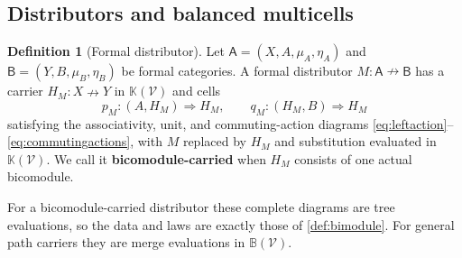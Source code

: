 \documentclass[11pt,reqno]{amsart}
\theoremstyle{plain}
\theoremstyle{definition}
\newtheorem{definition}[theorem]{Definition}
\theoremstyle{remark}
\numberwithin{equation}{section}
\newcommand{\V}{\mathcal V}
\newcommand{\Kcal}{\mathbb K}
\newcommand{\harr}{\mathrel{\nrightarrow}}
\newcommand{\cell}{\mathrel{\Longrightarrow}}
\begin{document}
\subsection{Distributors and balanced multicells}

\begin{definition}[Formal distributor]\label{def:formaldistributor}
Let $\mathsf A=(X,A,\mu_A,\eta_A)$ and
$\mathsf B=(Y,B,\mu_B,\eta_B)$ be formal categories. A formal
distributor $M:\mathsf A\harr\mathsf B$ has a carrier
$H_M:X\harr Y$ in $\Kcal(\V)$ and cells
\[
 p_M:(A,H_M)\cell H_M,\qquad
 q_M:(H_M,B)\cell H_M
\]
satisfying the associativity, unit, and commuting-action diagrams
\eqref{eq:leftaction}--\eqref{eq:commutingactions}, with $M$ replaced
by $H_M$ and substitution evaluated in $\Kcal(\V)$.
We call it \textbf{bicomodule-carried} when $H_M$ consists of one actual
bicomodule.
\end{definition}

For a bicomodule-carried distributor these complete diagrams are tree
evaluations, so the data and laws are exactly those of \cref{def:bimodule}.
For general path carriers they are merge evaluations in $\mathbb B(\V)$.
\end{document}
